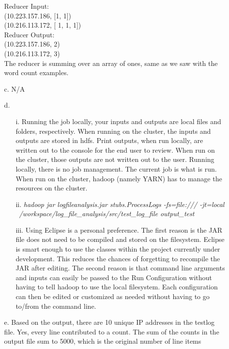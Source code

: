 \documentclass{article}
\begin{document}
\begin{itemize}
\begin{itemize}
	Reducer Input:\\
		(10.223.157.186, [1, 1])\\
		(10.216.113.172, [ 1, 1, 1])\\
		
	Reducer Output:\\
		(10.223.157.186, 2)\\
		(10.216.113.172, 3)\\

	The reducer is summing over an array of ones, same as we saw with the word count examples.
	
	\item[c.] N/A
	\item[d.]
		\begin{itemize}
		\item[i.] Running the job locally, your inputs and outputs are local files and folders, respectively. When running on the cluster, the inputs and outputs are stored in hdfs. Print outputs, when run locally, are written out to the console for the end user to review. When run on the cluster, those outputs are not written out to the user. Running locally, there is no job management. The current job is what is run. When run on the cluster, hadoop (namely YARN) has to manage the resources on the cluster.
		\item[ii.]
		\textit{hadoop jar logfileanalysis.jar stubs.ProcessLogs -fs=file:/// -jt=local ~/workspace/log\_file\_analysis/src/test\_log\_file output\_test}
		\item[iii.] Using Eclipse is a personal preference. The first reason is the JAR file does not need to be compiled and stored on the filesystem. Eclipse is smart enough to use the classes within the project currently under development. This reduces the chances of forgetting to recompile the JAR after editing. The second reason is that command line arguments and inputs can easily be passed to the Run Configuration without having to tell hadoop to use the local filesystem. Each configuration can then be edited or customized as needed without having to go to/from the command line.
		\end{itemize}
	\item[e.]
	Based on the output, there are 10 unique IP addresses in the testlog file. Yes, every line contributed to a count. The sum of the counts in the output file sum to 5000, which is the original number of line items

\end{itemize}
\end{itemize}
\end{document}
